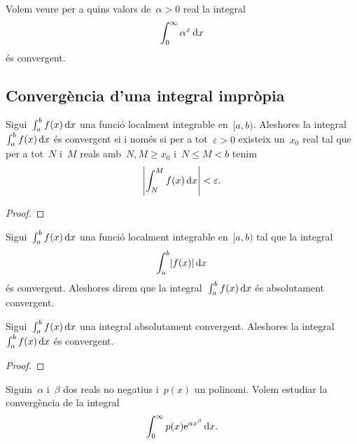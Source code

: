 \documentclass[../../main.tex]{subfiles}
\begin{document}
	\begin{example}
		\label{ex:criteri de la integral per integrals impròpies}
		Volem veure per a quins valors de~\(\alpha>0\) real la integral
		\begin{equation}
			\label{ex:criteri de la integral per integrals impròpies:eq1}
			\int_{0}^{\infty}\alpha^{x}\mathop{}\!\mathrm{d} x
		\end{equation}
		és convergent.
		\begin{solution}
		\end{solution}
	\end{example}
	\subsection{Convergència d'una integral impròpia}
	\begin{theorem}
		\label{thm:Condició de Cauchy per integrals impròpies}
		Sigui~\(\int_{a}^{b}f(x)\mathop{}\!\mathrm{d} x\) una funció localment integrable en~\([a,b)\).
		Aleshores la integral~\(\int_{a}^{b}f(x)\mathop{}\!\mathrm{d} x\) és convergent si i només si per a tot~\(\varepsilon>0\) existeix un~\(x_{0}\) real tal que per a tot~\(N\) i~\(M\) reals amb~\(N,M\geq x_{0}\) i~\(N\leq M<b\) tenim
		\[
		    \abs{\int_{N}^{M}f(x)\diff x}<\varepsilon.
		\]
		\begin{proof}
		\end{proof}
	\end{theorem}
	\begin{definition}
		\label{def:convergència absoluta d'una integral impròpia}
		Sigui~\(\int_{a}^{b}f(x)\mathop{}\!\mathrm{d} x\) una funció localment integrable en~\([a,b)\) tal que la integral
		\[
		    \int_{a}^{b}\abs{f(x)}\diff x
		\]
		és convergent.
		Aleshores direm que la integral~\(\int_{a}^{b}f(x)\mathop{}\!\mathrm{d} x\) és absolutament convergent.
	\end{definition}
	\begin{proposition}
		Sigui~\(\int_{a}^{b}f(x)\mathop{}\!\mathrm{d} x\) una integral absolutament convergent.
		Aleshores la integral~\(\int_{a}^{b}f(x)\mathop{}\!\mathrm{d} x\) és convergent.
		\begin{proof}
		\end{proof}
	\end{proposition}
	\begin{example}
		\label{ex:convèrgencia absoluta d'una integral impròpia amb un polinomi i una exponencial}
		Siguin~\(\alpha\) i~\(\beta\) dos reals no negatius i~\(p(x)\) un polinomi.
		Volem estudiar la convergència de la integral
		\[
		    \int_{0}^{\infty}p(x)\mathrm{e}^{\alpha x^{\beta}}\mathop{}\!\mathrm{d} x.
		\]
		\begin{solution}
		\end{solution}
	\end{example}
\end{document}
